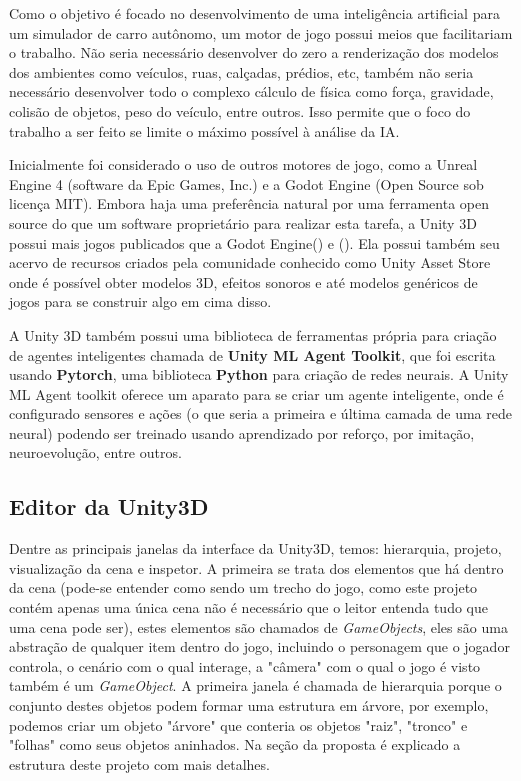 Como o objetivo é focado no desenvolvimento de uma inteligência artificial para um simulador de carro autônomo, um motor de jogo possui meios que facilitariam o trabalho. Não seria necessário desenvolver do zero a renderização dos modelos dos ambientes como veículos, ruas, calçadas, prédios, etc, também não seria necessário desenvolver todo o complexo cálculo de física como força, gravidade, colisão de objetos, peso do veículo, entre outros. Isso permite que o foco do trabalho a ser feito se limite o máximo possível à análise da IA.

Inicialmente foi considerado o uso de outros motores de jogo, como a Unreal Engine 4 (software da Epic Games, Inc.) e a Godot Engine (Open Source sob licença MIT). Embora haja uma preferência natural por uma ferramenta open source do que um software proprietário para realizar esta tarefa, a Unity 3D possui mais jogos publicados que a Godot Engine() e (). Ela possui também seu acervo de recursos criados pela comunidade conhecido como Unity Asset Store onde é possível obter modelos 3D, efeitos sonoros e até modelos genéricos de jogos para se construir algo em cima disso. 

A Unity 3D também possui uma biblioteca de ferramentas própria para criação de agentes inteligentes chamada de \textbf{Unity ML Agent Toolkit}, que foi escrita usando \textbf{Pytorch}, uma biblioteca \textbf{Python} para criação de redes neurais. A Unity ML Agent toolkit oferece um aparato para se criar um agente inteligente, onde é configurado sensores e ações (o que seria a primeira e última camada de uma rede neural) podendo ser treinado usando aprendizado por reforço, por imitação, neuroevolução, entre outros.

\subsection{Editor da Unity3D}
Dentre as principais janelas da interface da Unity3D, temos: hierarquia, projeto, visualização da cena e inspetor. A primeira se trata dos elementos que há dentro da cena (pode-se entender como sendo um trecho do jogo, como este projeto contém apenas uma única cena não é necessário que o leitor entenda tudo que uma cena pode ser), estes elementos são chamados de \textit{GameObjects}, eles são uma abstração de qualquer item dentro do jogo, incluindo o personagem que o jogador controla, o cenário com o qual interage, a "câmera"{} com o qual o jogo é visto também é um \textit{GameObject}. A primeira janela é chamada de hierarquia porque o conjunto destes objetos podem formar uma estrutura em árvore, por exemplo, podemos criar um objeto "árvore"{} que conteria os objetos "raiz", "tronco"{} e "folhas"{} como seus objetos aninhados. Na seção da proposta é explicado a estrutura deste projeto com mais detalhes.

